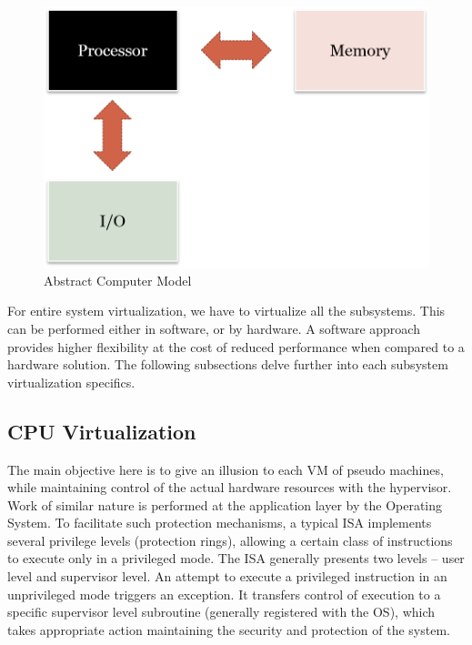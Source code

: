 \setlength{\belowcaptionskip}{-10pt}

\begin{figure}[H]
  \centering
  \includegraphics[scale=0.8]{figures/Mem_IO_CPU.png}
  \caption{Abstract Computer Model}
  \label{fig:mem_io}
\end{figure}
For entire system virtualization, we have to virtualize all the subsystems. This can be performed either in software, or by hardware. A software approach provides higher flexibility at the cost of reduced performance when compared to a hardware solution. The following subsections delve further into each subsystem virtualization specifics.

\subsection{CPU Virtualization}
The main objective here is to give an illusion to each VM of pseudo machines, while maintaining control of the actual hardware resources with the hypervisor. Work of similar nature is performed at the application layer by the Operating System. To facilitate such protection mechanisms, a typical ISA implements several privilege levels (protection rings), allowing a certain class of instructions to execute only in a privileged mode. The ISA generally presents two levels -- user level and supervisor level. An attempt to execute a privileged instruction in an unprivileged mode triggers an exception. It transfers control of execution to a specific supervisor level subroutine (generally registered with the OS), which takes appropriate action maintaining the security and protection of the system.

\setlength{\belowcaptionskip}{-10pt}

